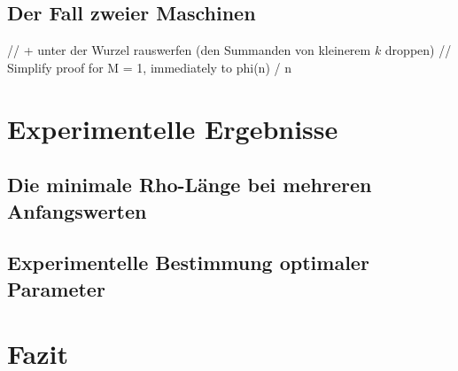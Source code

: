 \documentclass[a4paper, 10pt, ngerman]{article}
\begin{document}
\subsection{Der Fall zweier Maschinen}

// + unter der Wurzel rauswerfen (den Summanden von kleinerem $k$ droppen)
// Simplify proof for M = 1, immediately to phi(n) / n

\section{Experimentelle Ergebnisse}\label{sec:ex}

\subsection{Die minimale Rho-Länge bei mehreren Anfangswerten}

\subsection{Experimentelle Bestimmung optimaler Parameter}

\section{Fazit}

\printbibliography
\end{document}

